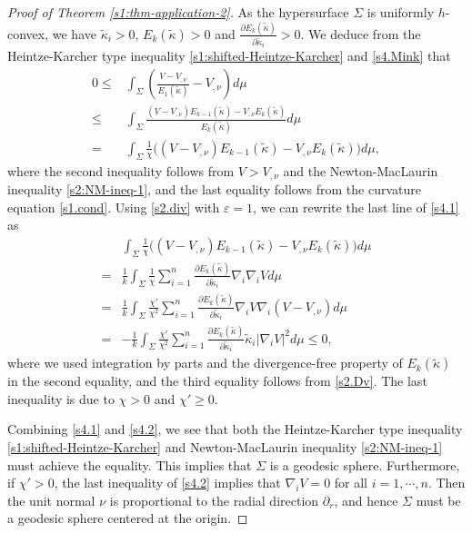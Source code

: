 \documentclass[11pt,reqno]{amsart}
\theoremstyle{definition}
\theoremstyle{remark}
\numberwithin{equation}{section}
\renewcommand{\(}{\left(}
\renewcommand{\)}{\right)}
\renewcommand{\~}{\widetilde}
\renewcommand{\-}{\overline}
\renewcommand{\k}{\kappa}
\begin{document}
\begin{proof}[Proof of Theorem \ref{s1:thm-application-2}]
	As the hypersurface $\Sigma$ is uniformly $h$-convex, we have $\~{\k}_i>0$, $E_k(\~\k)>0$ and $\frac{\partial E_k(\~{\k})}{\partial \~\k_i}>0$. We deduce from the Heintze-Karcher type inequality \eqref{s1:shifted-Heintze-Karcher} and \eqref{s4.Mink} that
	\begin{align}\label{s4.1}
	0\leq &\int_{\Sigma} \(\frac{V-V_{,\nu}}{E_1(\~{\k})}-V_{,\nu}\)d\mu\nonumber\\
	\leq &\int_{\Sigma} \frac{(V-V_{,\nu})E_{k-1}(\~{\k})-V_{,\nu} E_{k}(\~{\k})}{E_k(\~{\k})}d\mu\nonumber\\
	=&\int_{\Sigma}\frac{1}{\chi}\Big((V-V_{,\nu})E_{k-1}(\~{\k})-V_{,\nu} E_{k}(\~{\k})\Big)d\mu,
	\end{align}
	where the second inequality follows from $V>V_{,\nu}$ and the Newton-MacLaurin inequality \eqref{s2:NM-ineq-1}, and the last equality follows from the curvature equation \eqref{s1.cond}. Using \eqref{s2.div} with $\varepsilon=1$, we can rewrite the last line of \eqref{s4.1} as
\begin{align}\label{s4.2}
&\int_{\Sigma}\frac{1}{\chi}\Big((V-V_{,\nu})E_{k-1}(\~{\k})-V_{,\nu} E_{k}(\~{\k})\Big)d\mu\nonumber\\
=&\frac{1}{k}\int_{\Sigma}\frac{1}{\chi}\sum_{i=1}^n \frac{\partial E_k(\~{\k})}{\partial\~\k_i}\nabla_i\nabla_iVd\mu\nonumber\\
	=&\frac{1}{k}\int_{\Sigma} \frac{\chi'}{\chi^2}\sum_{i=1}^n \frac{\partial E_k(\~{\k})}{\partial \~\k_i} \nabla_i V\nabla_i(V-V_{,\nu})d\mu\nonumber\\
	=&-\frac{1}{k}\int_{\Sigma} \frac{\chi'}{\chi^2}\sum_{i=1}^n \frac{\partial E_k(\~{\k})}{\partial \~\k_i}\~{\k}_i |\nabla_i V|^2d\mu\leq 0,
	\end{align}
	where we used integration by parts and the divergence-free property of $E_k(\~\k)$ in the second equality, and the third equality follows from \eqref{s2.Dv}. The last inequality is due to $\chi>0$ and $\chi'\geq 0$.

Combining \eqref{s4.1} and \eqref{s4.2}, we see that both the Heintze-Karcher type inequality \eqref{s1:shifted-Heintze-Karcher} and Newton-MacLaurin inequality \eqref{s2:NM-ineq-1} must achieve the equality. This implies that $\Sigma$ is a geodesic sphere. Furthermore, if $\chi'>0$, the last inequality of \eqref{s4.2} implies that $\nabla_iV=0$ for all $i=1,\cdots,n$. Then the unit normal $\nu$ is proportional to the radial direction $\partial_r$, and hence $\Sigma$ must be a geodesic sphere centered at the origin.	
\end{proof}
\end{document}
